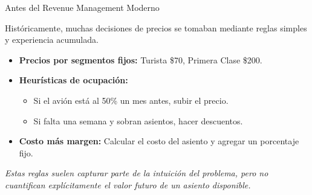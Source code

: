 \documentclass[xcolor=dvipsnames]{beamer}
\begin{document}

\begin{frame}{Antes del Revenue Management Moderno}

Históricamente, muchas decisiones de precios se tomaban mediante reglas simples y experiencia acumulada.

\begin{itemize}
\item \textbf{Precios por segmentos fijos:}
Turista \$70, Primera Clase \$200.

\item \textbf{Heurísticas de ocupación:}
\begin{itemize}
    \item Si el avión está al 50\% un mes antes, subir el precio.
    \item Si falta una semana y sobran asientos, hacer descuentos.
\end{itemize}

\item \textbf{Costo más margen:}
Calcular el costo del asiento y agregar un porcentaje fijo.

\end{itemize}

\vspace{0.3cm}

\textit{Estas reglas suelen capturar parte de la intuición del problema, pero no cuantifican explícitamente el valor futuro de un asiento disponible.}

\end{frame}

\end{document}
